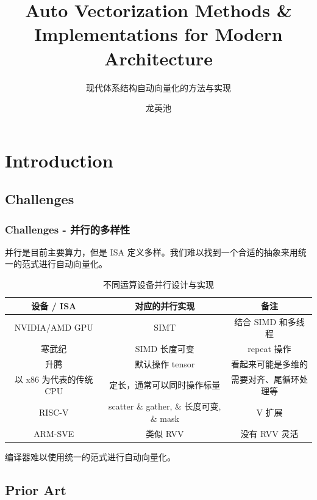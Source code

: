 \documentclass[aspectratio=169]{ctexbeamer}
\title{Auto Vectorization Methods \& Implementations for Modern Architecture}
\subtitle{现代体系结构自动向量化的方法与实现}
\author{龙英池}
\institute{Interns @ ISCAS}
\begin{document}
\maketitle
\section{Introduction}
\subsection{Challenges}
\begin{frame}
    \frametitle{Challenges - 并行的多样性}

    并行是目前主要算力，但是 ISA 定义多样。我们难以找到一个合适的抽象来用统一的范式进行自动向量化。

    \begin{table}
        \centering
        \caption{不同运算设备并行设计与实现}
        \scriptsize
        \begin{tabular}{ccc}
            \toprule
            设备 / ISA         & 对应的并行实现                             & 备注           \\
            \midrule
            NVIDIA/AMD GPU   & SIMT                                & 结合 SIMD 和多线程 \\
            寒武纪              & SIMD 长度可变                           & repeat 操作    \\
            升腾               & 默认操作 tensor                         & 看起来可能是多维的    \\
            以 x86 为代表的传统 CPU & 定长，通常可以同时操作标量                       & 需要对齐、尾循环处理等  \\
            RISC-V           & scatter \& gather, \& 长度可变, \& mask & V 扩展         \\
            ARM-SVE          & 类似 RVV                              & 没有 RVV 灵活    \\
            \bottomrule
        \end{tabular}
    \end{table}

    编译器难以使用统一的范式进行自动向量化。

\end{frame}

\subsection{Prior Art}
\end{document}
